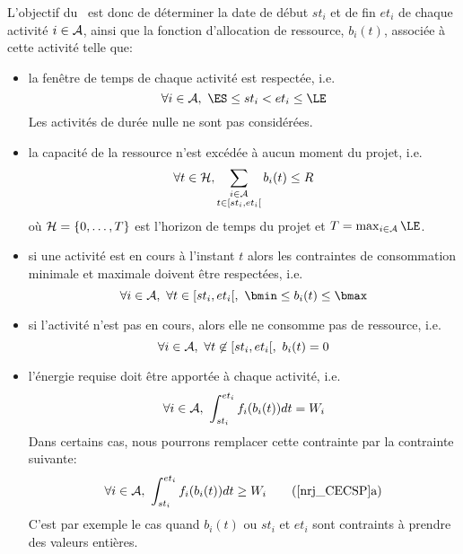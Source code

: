 L'objectif du \CECSP~est donc de déterminer la date de début $st_i$ et
de fin $et_i$ de chaque activité $i \in {\cal A}$, ainsi que la fonction
d'allocation de ressource, $b_i(t)$, associée à
cette activité telle que: 
\begin{itemize}
\item la fenêtre de temps de chaque activité est respectée, i.e. 
  \begin{equation} 
    \forall i \in \A,\ \ES \le st_i < et_i \le \LE \label{tw_CECSP}
  \end{equation}
  Les activités de durée nulle ne sont pas considérées. 
\item la capacité de la ressource n'est excédée à aucun moment du
  projet, i.e.
  \begin{equation} 
    \forall t \in {\cal H},\sum_{\substack{i\in {\cal A}\\ t \in
        [st_i,et_i[}} b_i(t) \le  R \label{res_CECSP}
  \end{equation}
  où ${\cal H}=\{0,\dots,T\}$ est l'horizon de temps du projet et $T=\max_{i
    \in \A} \LE$.
\item si une activité est en cours à l'instant $t$ alors les
  contraintes de consommation minimale et maximale doivent être
  respectées, i.e.  
  \begin{equation}
    \forall i \in \A,\ \forall t \in [st_i,et_i[,\ \bmin \le b_i(t) \le
    \bmax \label{req_CECSP}
  \end{equation}
\item si l'activité n'est pas en cours, alors elle ne consomme pas de
  ressource, i.e.
  \begin{equation}
    \label{nulleConso_CECSP}
    \forall i \in {\cal A},\ \forall t \not\in [st_i,et_i[,\  b_i(t)=0 
  \end{equation}
\item l'énergie requise doit être apportée à chaque activité, i.e. 
  \begin{equation}
    \forall i \in \A,\ \int_{st_i}^{et_i}f_i(b_i(t))dt=W_i \label{nrj_CECSP}
  \end{equation}
  Dans certains cas, nous pourrons remplacer cette contrainte par la
  contrainte suivante:
  \begin{equation}
    \forall i \in \A,\ \int_{st_i}^{et_i}f_i(b_i(t))dt \ge W_i \tag{\ref{nrj_CECSP}a}
  \end{equation}
  C'est par exemple le cas quand $b_i(t)$ ou $st_i$ et $et_i$ sont
  contraints à prendre des valeurs entières.
\end{itemize}

